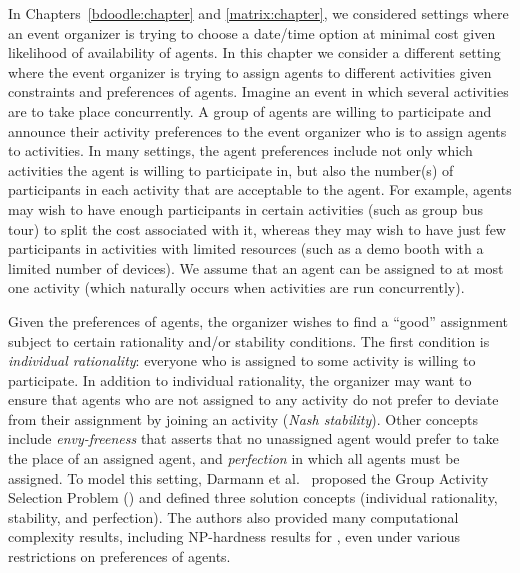 \label{GASP:chapter}

In Chapters~\ref{bdoodle:chapter} and \ref{matrix:chapter}, we considered settings where an event organizer is trying to choose a date/time option at minimal cost given likelihood of availability of agents.
In this chapter we consider a different setting where the event organizer is trying to assign agents to different activities given constraints and preferences of agents. 
Imagine an event in which several activities are to take place concurrently. A group of agents are willing to participate and announce their activity preferences to the event organizer who is to assign agents to activities. In many settings, the agent preferences include not only which activities the agent is willing to participate in, but also the number(s) of participants in each activity that are acceptable to the agent.
For example, agents may wish to have enough participants in certain activities (such as group bus tour) to split the cost associated with it, whereas they may wish to have just few participants in activities with limited resources (such as a demo booth with a limited number of devices). 
We assume that an agent can be assigned to at most one activity (which naturally occurs when activities are run concurrently).

Given the preferences of agents, the organizer wishes to find a ``good'' assignment subject to certain rationality and/or stability conditions. 
The first condition is {\em individual rationality}: everyone who is assigned to some activity is willing to participate. In addition to individual rationality, the organizer may want to ensure that agents who are not assigned to any activity 
do not prefer to deviate from their assignment by joining an activity ({\em Nash stability}). Other concepts include {\em envy-freeness} that asserts that no unassigned agent would prefer to take the place of an assigned agent, and {\em perfection} in which all agents must be assigned.
To model this setting, Darmann et al.~\cite{GASP12WINE} proposed the Group Activity Selection Problem (\GASP) and defined three solution concepts (individual rationality, stability, and perfection). The authors also provided many computational complexity results, including NP-hardness results for \GASP, even under various restrictions on preferences of agents. 

